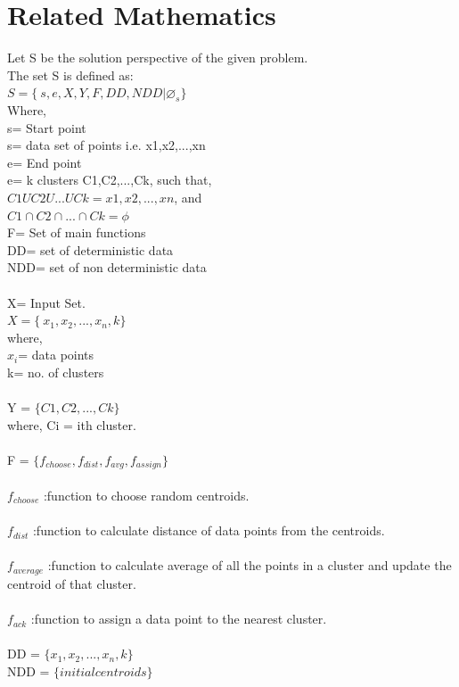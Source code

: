 \documentclass[10pt,a4paper]{article}
\begin{document}
\section{Related Mathematics}
Let S be the solution perspective of the given problem.
\\The set S is defined as:
\\$S=\lbrace\ s,e,X,Y,F,DD,NDD|\varnothing_{s}\rbrace$
\\Where,
\\s= Start point 
\\s= data set of points i.e. {x1,x2,...,xn}
\\e= End point 
\\e= k clusters {C1,C2,...,Ck}, such that,
\\$C1 U C2 U...U Ck = {x1,x2,...,xn}$, and
\\$C1 \cap C2 \cap ... \cap Ck = \phi$
\\F= Set of main functions
\\DD= set of deterministic data
\\NDD= set of non deterministic data
\\\\X= Input Set.
\\$X=\lbrace\ x_{1},x_{2},...,x_{n},k \rbrace$
\\where,
\\$x_{i}$= data points
\\k= no. of clusters
\\\\ Y = $\lbrace C1, C2, ..., Ck \rbrace$
\\where, Ci = ith cluster.
\\\\ F = $\lbrace f_{choose}, f_{dist}, f_{avg}, f_{assign} \rbrace$
\\\\$f_{choose}$  :function to choose random centroids.
\\\\ $f_{dist}$ :function to calculate distance of data points from the centroids.
\\\\ $f_{average}$ :function to calculate average of all the points in a cluster and update the centroid of that cluster.
\\\\ $f_{ack}$ :function to assign a data point to the nearest cluster.
\\\\ DD = $\lbrace x_{1},x_{2},...,x_{n},k \rbrace$
\\ NDD = $\lbrace initial centroids \rbrace$
\end{document}
